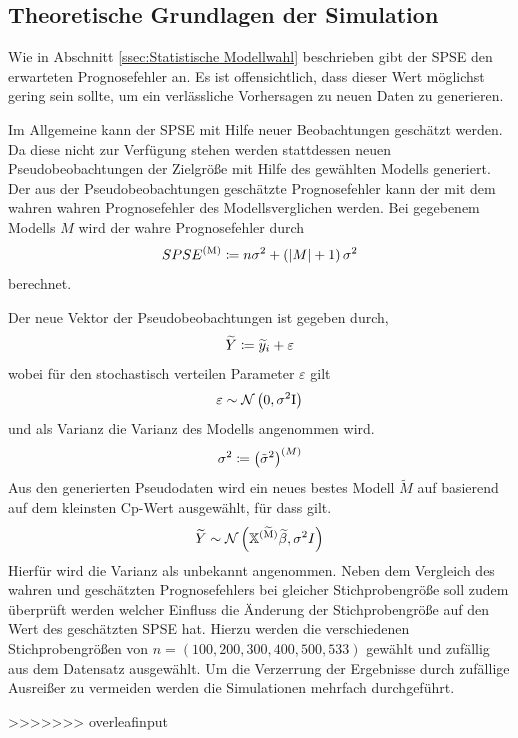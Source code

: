 


	\subsection{Theoretische Grundlagen der Simulation}
	\label{ssec:Theoretische Grundlagen der Simulation}

        Wie in Abschnitt \ref{ssec:Statistische Modellwahl} beschrieben gibt der SPSE den erwarteten Prognosefehler an.
        Es ist offensichtlich, dass dieser Wert möglichst gering sein sollte, um ein verlässliche Vorhersagen zu neuen Daten zu generieren.

        Im Allgemeine kann der SPSE mit Hilfe neuer Beobachtungen geschätzt werden.\cite{Schumacher Skript}
        Da diese nicht zur Verfügung stehen werden stattdessen neuen Pseudobeobachtungen der Zielgröße mit Hilfe des gewählten Modells generiert.
        Der aus der Pseudobeobachtungen geschätzte Prognosefehler kann der mit dem wahren wahren Prognosefehler des Modellsverglichen werden.
        Bei gegebenem Modells $M$ wird der wahre Prognosefehler durch
        \[
            SPSE^{\mathrm{(M)}} \coloneqq  n \sigma^2 + \left( \left\vert M \right\vert+1 \right) \sigma^2
        \]
        berechnet.

        Der neue Vektor der Pseudobeobachtungen ist gegeben durch,
        \[
            \widetilde{Y} \coloneqq \widetilde{y}_i + \varepsilon
        \]
        wobei für den stochastisch verteilen Parameter $\varepsilon$ gilt
        \[
            \varepsilon \sim \mathcal{N} \left( 0,\sigma^2\mathrm{I} \right)
        \]
        und als Varianz die Varianz des Modells angenommen wird.
        \[
            \sigma^2 \coloneqq \left( \tilde{\sigma}^2 \right)^{(M)}
        \]
        Aus den generierten Pseudodaten wird ein neues bestes Modell $\widetilde{M}$ auf basierend auf dem kleinsten Cp-Wert ausgewählt, für dass gilt.
        \[
            \widetilde{Y} \sim \mathcal{N} \left( \mathbb{X}^{\mathrm{(\widetilde{M})}}\widetilde{\beta}, \sigma^2 I \right)
        \]
        Hierfür wird die Varianz als unbekannt angenommen.
        Neben dem Vergleich des wahren und geschätzten Prognosefehlers bei gleicher Stichprobengröße soll zudem überprüft werden welcher Einfluss die Änderung der Stichprobengröße auf den Wert des geschätzten SPSE hat.
        Hierzu werden die verschiedenen Stichprobengrößen von $n = (100, 200, 300, 400, 500, 533)$ gewählt und zufällig aus dem Datensatz ausgewählt.
        Um die Verzerrung der Ergebnisse durch zufällige Ausreißer zu vermeiden werden die Simulationen mehrfach durchgeführt.


>>>>>>> overleafinput
